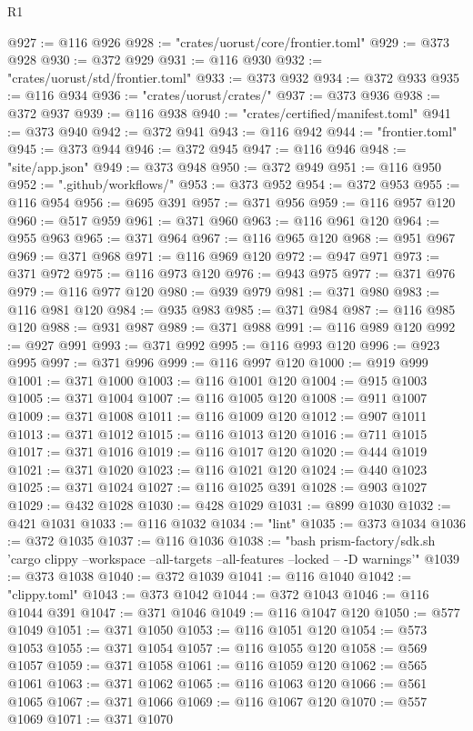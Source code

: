 \begin{lexlean}{R1}
\begin{coremodule}
@927 := @116 @926
@928 := "crates/uorust/core/frontier.toml"
@929 := @373 @928
@930 := @372 @929
@931 := @116 @930
@932 := "crates/uorust/std/frontier.toml"
@933 := @373 @932
@934 := @372 @933
@935 := @116 @934
@936 := "crates/uorust/crates/"
@937 := @373 @936
@938 := @372 @937
@939 := @116 @938
@940 := "crates/certified/manifest.toml"
@941 := @373 @940
@942 := @372 @941
@943 := @116 @942
@944 := "frontier.toml"
@945 := @373 @944
@946 := @372 @945
@947 := @116 @946
@948 := "site/app.json"
@949 := @373 @948
@950 := @372 @949
@951 := @116 @950
@952 := ".github/workflows/"
@953 := @373 @952
@954 := @372 @953
@955 := @116 @954
@956 := @695 @391
@957 := @371 @956
@959 := @116 @957 @120
@960 := @517 @959
@961 := @371 @960
@963 := @116 @961 @120
@964 := @955 @963
@965 := @371 @964
@967 := @116 @965 @120
@968 := @951 @967
@969 := @371 @968
@971 := @116 @969 @120
@972 := @947 @971
@973 := @371 @972
@975 := @116 @973 @120
@976 := @943 @975
@977 := @371 @976
@979 := @116 @977 @120
@980 := @939 @979
@981 := @371 @980
@983 := @116 @981 @120
@984 := @935 @983
@985 := @371 @984
@987 := @116 @985 @120
@988 := @931 @987
@989 := @371 @988
@991 := @116 @989 @120
@992 := @927 @991
@993 := @371 @992
@995 := @116 @993 @120
@996 := @923 @995
@997 := @371 @996
@999 := @116 @997 @120
@1000 := @919 @999
@1001 := @371 @1000
@1003 := @116 @1001 @120
@1004 := @915 @1003
@1005 := @371 @1004
@1007 := @116 @1005 @120
@1008 := @911 @1007
@1009 := @371 @1008
@1011 := @116 @1009 @120
@1012 := @907 @1011
@1013 := @371 @1012
@1015 := @116 @1013 @120
@1016 := @711 @1015
@1017 := @371 @1016
@1019 := @116 @1017 @120
@1020 := @444 @1019
@1021 := @371 @1020
@1023 := @116 @1021 @120
@1024 := @440 @1023
@1025 := @371 @1024
@1027 := @116 @1025 @391
@1028 := @903 @1027
@1029 := @432 @1028
@1030 := @428 @1029
@1031 := @899 @1030
@1032 := @421 @1031
@1033 := @116 @1032
@1034 := "lint"
@1035 := @373 @1034
@1036 := @372 @1035
@1037 := @116 @1036
@1038 := "bash prism-factory/sdk.sh 'cargo clippy --workspace --all-targets --all-features --locked -- -D warnings'"
@1039 := @373 @1038
@1040 := @372 @1039
@1041 := @116 @1040
@1042 := "clippy.toml"
@1043 := @373 @1042
@1044 := @372 @1043
@1046 := @116 @1044 @391
@1047 := @371 @1046
@1049 := @116 @1047 @120
@1050 := @577 @1049
@1051 := @371 @1050
@1053 := @116 @1051 @120
@1054 := @573 @1053
@1055 := @371 @1054
@1057 := @116 @1055 @120
@1058 := @569 @1057
@1059 := @371 @1058
@1061 := @116 @1059 @120
@1062 := @565 @1061
@1063 := @371 @1062
@1065 := @116 @1063 @120
@1066 := @561 @1065
@1067 := @371 @1066
@1069 := @116 @1067 @120
@1070 := @557 @1069
@1071 := @371 @1070

\end{coremodule}
\end{lexlean}
